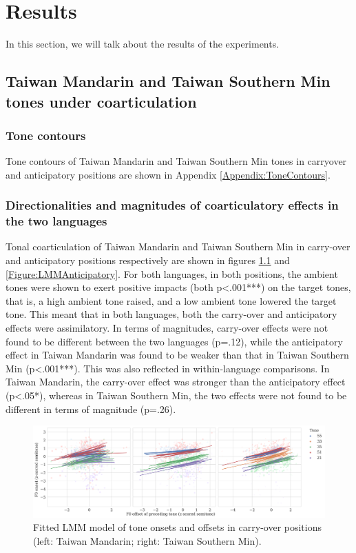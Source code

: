 
\chapter{Results}\label{chapter:Results}

In this section, we will talk about the results of the experiments.

\section{Taiwan Mandarin and Taiwan Southern Min tones under coarticulation}

\subsection{Tone contours}

Tone contours of Taiwan Mandarin and Taiwan Southern Min tones in carryover and anticipatory positions are shown in Appendix \ref{Appendix:ToneContours}.

\subsection{Directionalities and magnitudes of coarticulatory effects in the two languages}

Tonal coarticulation of Taiwan Mandarin and Taiwan Southern Min in carry-over and anticipatory positions respectively are shown in figures \ref{Figure:LMMCarryover} and \ref{Figure:LMMAnticipatory}. For both languages, in both positions, the ambient tones were shown to exert positive impacts (both p<.001***) on the target tones, that is, a high ambient tone raised, and a low ambient tone lowered the target tone. This meant that in both languages, both the carry-over and anticipatory effects were assimilatory. In terms of magnitudes, carry-over effects were not found to be different between the two languages (p=.12), while the anticipatory effect in Taiwan Mandarin was found to be weaker than that in Taiwan Southern Min (p<.001***).
This was also reflected in within-language comparisons. In Taiwan Mandarin, the carry-over effect was stronger than the anticipatory effect (p<.05*), whereas in Taiwan Southern Min, the two effects were not found to be different in terms of magnitude (p=.26).

\begin{figure}[hbt!]
\centering
\includegraphics[width=\textwidth, trim={0 .5cm 0 0}]{figures/E1/Carryover_lang_seperated.png}
\caption{Fitted LMM model of tone onsets and offsets in carry-over positions (left: Taiwan Mandarin; right: Taiwan Southern Min).}
\label{Figure:LMMCarryover}
\end{figure}

